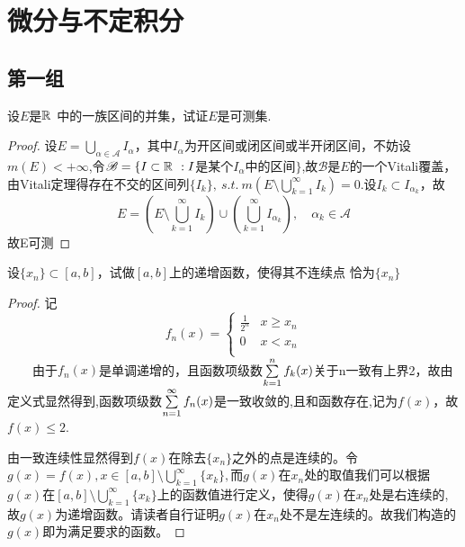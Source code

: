 \chapter{微分与不定积分}
\section{第一组}
设$E$是$\R{R}{\ }$中的一族区间的并集，试证$E$是可测集.
\begin{proof}
	设$E=\bigcup\limits_{\alpha\in \mathscr{A}}I_{\alpha}$，其中$ I_{\alpha} $为开区间或闭区间或半开闭区间，不妨设$m(E)<+\infty$,令$\mathscr{B}=\{I\subset\R{R}{\ }:I$是某个$I_{\alpha}$中的区间$\}$,故$\mathscr{B}$是$E$的一个Vitali覆盖，由Vitali定理得存在不交的区间列$\{I_k\},\ s.t.\ m\left( E\setminus \bigcup\limits_{k=1}^{\infty}I_k\right) =0$.设$I_k\subset I_{\alpha_k}$，故$$E=\left( E\setminus \bigcup_{k=1}^{\infty}I_k\right) \cup \left( \bigcup_{k=1}^{\infty}I_{\alpha_k}\right),\quad\alpha_k\in \mathscr{A} $$故E可测
\end{proof}


设$\{x_n\}\subset [a,b]$，试做$[a,b]$上的递增函数，使得其不连续点 恰为$\{x_n\}$
\begin{proof}
	记\[f_n(x)=
	\begin{cases}
	\frac{1}{2^n}&x\geq x_n\\
	0&x< x_n\\
	\end{cases}\]
	$\qquad$由于$f_n(x)$是单调递增的，且函数项级数$\sum\limits\limits_{k=1}^{n}f_k(x)$关于n一致有上界2，故由定义式显然得到,函数项级数$\sum\limits\limits_{n=1}^{\infty}f_n(x)$是一致收敛的,且和函数存在,记为$f(x)$，故$f(x)\leq2$.\par 由一致连续性显然得到$f(x)$在除去$\{x_n\}$之外的点是连续的。令$g(x)=f(x),x\in [a,b]\setminus\bigcup\limits_{k=1}^{\infty}\{x_k\},$而$g(x)$在$x_n$处的取值我们可以根据$g(x)$在$[a,b]\setminus\bigcup\limits_{k=1}^{\infty}\{x_k\}$上的函数值进行定义，使得$g(x)$在$x_n$处是右连续的,故$g(x)$为递增函数。请读者自行证明$g(x)$在$x_n$处不是左连续的。故我们构造的$g(x)$即为满足要求的函数。
\end{proof}



